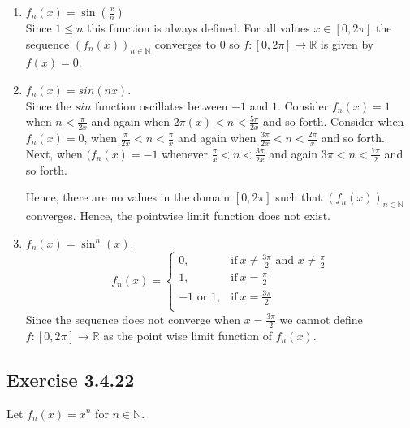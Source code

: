 \documentclass{tufte-book}
\theoremstyle{mytheoremstyle}
\theoremstyle{mylemstyle}
\theoremstyle{mydefstyle}
\begin{document}
\begin{enumerate}

\item $f_n(x) = \sin(\frac{x}{n})$\\
Since $1 \leq n$ this function is always defined.  For all values $x \in [0,2\pi]$ the sequence $(f_n(x))_{n \in \mathbb{N}}$ converges to $0$ so $f:[0,2\pi] \rightarrow \mathbb{R}$ is given by $f(x) = 0$.

\item $f_n(x) = sin(nx)$.\\
Since the $sin$ function oscillates between $-1$ and $1$.  Consider $f_n(x) = 1$ when $n < \frac{\pi}{2x}$ and again when $2\pi(x) < n < \frac{5\pi}{2x}$ and so forth. Consider when $f_n(x) = 0$,  when $\frac{\pi}{2x}<n<\frac{\pi}{x}$ and again  when $\frac{3\pi}{2x} < n < \frac{2\pi}{x}$ and so forth.  Next, when $(f_n(x) = -1$ whenever $\frac{\pi}{x}<n<\frac{3\pi}{2x}$ and again $3\pi < n < \frac{7\pi}{2}$ and so forth.

Hence, there are no values in the domain $[0, 2\pi]$ such that $(f_n(x))_{n \in \mathbb{N}}$ converges.  Hence, the pointwise limit function does not exist.

\item $f_n(x) = \sin^n(x)$.
\[f_n(x) = 
\begin{cases}
      0, & \text{if}\ x \neq \frac{3\pi}{2} \text{ and } x\neq \frac{\pi}{2} \\
      1, & \text{if}\ x = \frac{\pi}{2}\\
      -1 \text{ or } 1, & \text{if}\ x = \frac{3\pi}{2}\\
\end{cases}
\]
Since the sequence does not converge when $x = \frac{3\pi}{2}$ we cannot define $f: [0,2\pi] \rightarrow \mathbb{R}$ as the point wise limit function of $f_n(x)$.

\end{enumerate}

\subsection{Exercise 3.4.22}
Let $f_n(x) = x^n$ for $n \in \mathbb{N}$.
\end{document}
